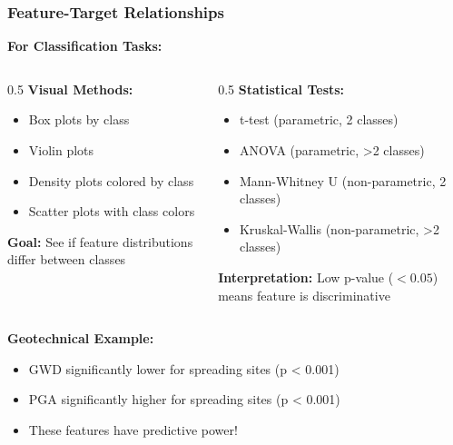 \documentclass[aspectratio=169]{beamer}
\begin{document}
\begin{frame}
\frametitle{Feature-Target Relationships}

\textbf{For Classification Tasks:}

\begin{columns}[T]
    \begin{column}{0.5\textwidth}
        \textbf{Visual Methods:}
        \begin{itemize}
            \item Box plots by class
            \item Violin plots
            \item Density plots colored by class
            \item Scatter plots with class colors
        \end{itemize}

        \textbf{Goal:} See if feature distributions differ between classes
    \end{column}
    \begin{column}{0.5\textwidth}
        \textbf{Statistical Tests:}
        \begin{itemize}
            \item t-test (parametric, 2 classes)
            \item ANOVA (parametric, >2 classes)
            \item Mann-Whitney U (non-parametric, 2 classes)
            \item Kruskal-Wallis (non-parametric, >2 classes)
        \end{itemize}

        \textbf{Interpretation:} Low p-value ($<0.05$) means feature is discriminative
    \end{column}
\end{columns}

\vspace{0.5cm}

\textbf{Geotechnical Example:}
\begin{itemize}
    \item GWD significantly lower for spreading sites (p < 0.001)
    \item PGA significantly higher for spreading sites (p < 0.001)
    \item These features have predictive power!
\end{itemize}

\end{frame}
\end{document}
